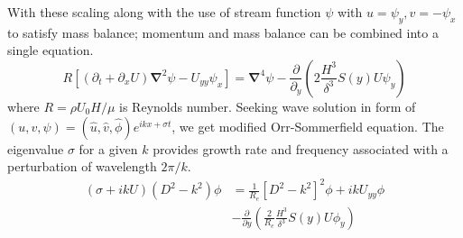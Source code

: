 \documentclass[aps,prl,twocolumn,showpacs,superscriptaddress,groupedaddress,10pt]{revtex4-1}  %
\newcommand{\grad}{\mathbf{\nabla}}
\newcommand{\del}{\partial}
\begin{document}
With these scaling along with the use of stream function $\psi$ with $u = \psi_{y}, v= -\psi_x$ to satisfy mass balance; momentum and mass balance can be combined 
into a single equation.
\small
\begin{equation}
R \left[ (\del_t+\del_x U )\grad^2\psi - U_{yy}\psi_x \right] = \grad^4\psi-\frac{\del}{\del_y}\left({2}\frac{H^3}{\delta^3}S(y) U\psi_y\right)
\end{equation}
\normalsize
where $R= {\rho U_0 H}/{\mu}$ is Reynolds number. Seeking wave solution in form of $\left(u,v,\psi \right)= \left(\hat u, \hat v, \hat\phi \right)e^{ikx+\sigma t}$, 
we get modified Orr-Sommerfield equation. The eigenvalue $\sigma$ for a given $k$ provides growth rate and frequency associated with a perturbation of wavelength $2\pi/k$.
\small
\begin{equation}
\begin{split}
\left(\sigma+ikU\right) \left(D^2-k^2\right)\phi &= \frac{1}{R_{e}}\left[D^2 -k^{2} \right]^2\phi +ikU_{yy}\phi \\
&-\frac{\del}{\del y}\left(\frac{2}{R_e}\frac{H^3}{\delta^3}S(y) U\phi_y\right)
\label{Orr-somerfield}
\end{split}
\end{equation}
\normalsize
\end{document}
